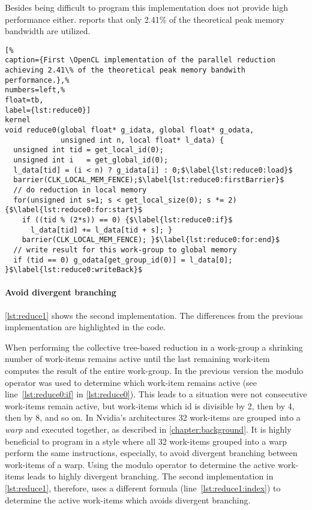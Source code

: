 Besides being difficult to program this implementation does not provide high performance either.
\citeauthor{Harris2007} reports that only 2.41\% of the theoretical peak memory bandwidth are utilized. 

\begin{lstlisting}[%                                                             
caption={First \OpenCL implementation of the parallel reduction achieving 2.41\% of the theoretical peak memory bandwith performance.},%
numbers=left,%
float=tb,
label={lst:reduce0}]
kernel
void reduce0(global float* g_idata, global float* g_odata,
             unsigned int n, local float* l_data) {
  unsigned int tid = get_local_id(0);
  unsigned int i   = get_global_id(0);
  l_data[tid] = (i < n) ? g_idata[i] : 0;$\label{lst:reduce0:load}$
  barrier(CLK_LOCAL_MEM_FENCE);$\label{lst:reduce0:firstBarrier}$
  // do reduction in local memory
  for(unsigned int s=1; s < get_local_size(0); s *= 2) {$\label{lst:reduce0:for:start}$
    if ((tid % (2*s)) == 0) {$\label{lst:reduce0:if}$
      l_data[tid] += l_data[tid + s]; }
    barrier(CLK_LOCAL_MEM_FENCE); }$\label{lst:reduce0:for:end}$
  // write result for this work-group to global memory
  if (tid == 0) g_odata[get_group_id(0)] = l_data[0]; }$\label{lst:reduce0:writeBack}$
\end{lstlisting}

\FloatBarrier
\newpage

\paragraph{Avoid divergent branching}

\autoref{lst:reduce1} shows the second implementation.
The differences from the previous implementation are highlighted in the code.

When performing the collective tree-based reduction in a work-group a shrinking number of work-items remains active until the last remaining work-item computes the result of the entire work-group.
In the previous version the modulo operator was used to determine which work-item remains active (see line~\ref{lst:reduce0:if} in \autoref{lst:reduce0}).
This leads to a situation were not consecutive work-items remain active, but work-items which id is divisible by 2, then by 4, then by 8, and so on.
In Nvidia's \GPU architectures 32 work-items are grouped into a \emph{warp} and executed together, as described in \autoref{chapter:background}.
It is highly beneficial to program in a style where all 32 work-items grouped into a warp perform the same instructions, especially, to avoid divergent branching between work-items of a warp.
Using the modulo operator to determine the active work-items leads to highly divergent branching.
The second implementation in \autoref{lst:reduce1}, therefore, uses a different formula (line~\ref{lst:reduce1:index}) to determine the active work-items which avoids divergent branching.

